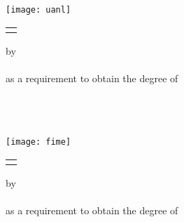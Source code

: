 \thispagestyle{empty}

\begin{scshape}
\begin{center}
	{\Large \uanl} \\[5mm]
	{\large \fime} \\[5mm]
	{\large \depg}
	\vskip15mm
	\texttt{[image: uanl]}
	\vskip12mm
	\begin{tabular}{p{11cm}}
		\centering
		{\large \tituloEng}
	\end{tabular}
	\vskip7mm
	{by}\\[7mm]
	{\large \autor}\\[7mm]
	{as a requirement to obtain the degree of}\\[3mm]
	\MakeUppercase{\gradoEng}\\
	\orientacion
	\vfill
	\fechaEng
\end{center}
\end{scshape}
 
\newpage
\thispagestyle{empty}

\begin{scshape}
\begin{center}
	{\Large\uanl} \\[5mm]
	{\large\fime} \\[5mm]
	{\large\depg}
	\vskip16mm
	\texttt{[image: fime]}
	\vskip16mm
	\begin{tabular}{p{11cm}}
		\centering
		{\large \tituloEng}
	\end{tabular}
	\vskip7mm
	{by}\\[7mm]
	{\large \autor}\\[7mm]
	{as a requirement to obtain the degree of}\\[3mm]
	\MakeUppercase{\gradoEng}\\
	\orientacion
	\vfill
	\fechaEng
\end{center}
\end{scshape}

\newpage
\thispagestyle{empty}
\enlargethispage{5mm}

